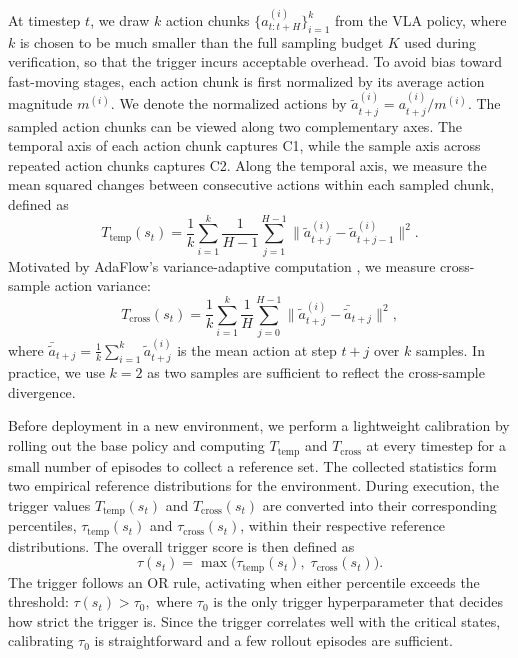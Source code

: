 \documentclass[10pt,twocolumn,letterpaper]{article}
\begin{document}
At timestep $t$, we draw $k$ action chunks $\{a_{t:t+H}^{(i)}\}_{i=1}^{k}$ from the VLA policy, where $k$ is chosen to be much smaller than the full sampling budget $K$ used during verification, so that the trigger incurs acceptable overhead. To avoid bias toward fast-moving stages, each action chunk is first normalized by its average action magnitude $m^{(i)}$. We denote the normalized actions by $\tilde{a}^{(i)}_{t+j}=a^{(i)}_{t+j}/m^{(i)}$. The sampled action chunks can be viewed along two complementary axes. The temporal axis of each action chunk captures C1, while the sample axis across repeated action chunks captures C2. Along the temporal axis, we measure the mean squared changes between consecutive actions within each sampled chunk, defined as
\begin{equation}
T_{\text{temp}}(s_t) = \frac{1}{k} \sum_{i=1}^k \frac{1}{H-1}\sum_{j=1}^{H-1}\|\tilde{a}^{(i)}_{t+j} - \tilde{a}^{(i)}_{t+j-1}\|^2.
\end{equation}
Motivated by AdaFlow's variance-adaptive computation \cite{hu2024adaflowimitationlearningvarianceadaptive}, we measure cross-sample action variance:
\begin{equation}
T_{\text{cross}}(s_t) = \frac{1}{k}\sum_{i=1}^{k}\frac{1}{H}\sum_{j=0}^{H-1}
\big\| \tilde{a}_{t+j}^{(i)} - \bar{\tilde{a}}_{t+j} \big\|^2,
\end{equation} where $\bar{\tilde{a}}_{t+j} = \frac{1}{k}\sum_{i=1}^{k} \tilde{a}_{t+j}^{(i)}$ is the mean action at step $t+j$ over $k$ samples. In practice, we use $k=2$ as two samples are sufficient to reflect the cross-sample divergence.

Before deployment in a new environment, we perform a lightweight calibration by rolling out the base policy and computing $T_{\text{temp}}$ and $T_{\text{cross}}$ at every timestep for a small number of episodes to collect a reference set. The collected statistics form two empirical reference distributions for the environment. During execution, the trigger values $T_{\text{temp}}(s_t)$ and $T_{\text{cross}}(s_t)$ are converted into their corresponding percentiles, $\tau_{\text{temp}}(s_t)$ and $\tau_{\text{cross}}(s_t)$, within their respective reference distributions. The overall trigger score is then defined as
\begin{equation}
\tau(s_t) = \max\bigl(\tau_{\mathrm{temp}}(s_t),\; \tau_{\mathrm{cross}}(s_t)\bigr).
\end{equation}
The trigger follows an OR rule, activating when either percentile exceeds the threshold:
$\tau(s_t) > \tau_0,$
where $\tau_0$ is the only trigger hyperparameter that decides how strict the trigger is. Since the trigger correlates well with the critical states, calibrating $\tau_0$ is straightforward and a few rollout episodes are sufficient.
\end{document}

